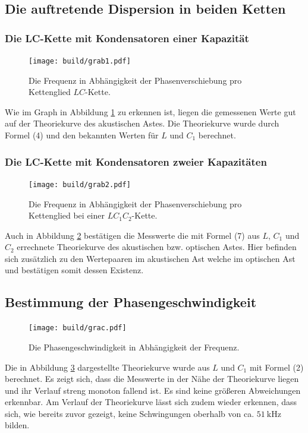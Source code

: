 \subsection{Die auftretende Dispersion in beiden Ketten}
\subsubsection{Die LC-Kette mit Kondensatoren einer Kapazität}
\begin{figure}[H]
	\centering
	\caption{Die Frequenz in Abhängigkeit der Phasenverschiebung pro Kettenglied $LC$-Kette.}
	\texttt{[image: build/grab1.pdf]}
	\label{fig:grab1}
\end{figure}

Wie im Graph in Abbildung \ref{fig:grab1} zu erkennen ist, liegen die gemessenen Werte gut auf der Theoriekurve des akustischen Astes. Die Theoriekurve wurde durch Formel (4) und den bekannten Werten für $L$ und $C_1$ berechnet.


\subsubsection{Die LC-Kette mit Kondensatoren zweier Kapazitäten}
\begin{figure}[H]
	\centering
	\caption{Die Frequenz in Abhängigkeit der Phasenverschiebung pro Kettenglied bei einer $LC_1C_2$-Kette.}
	\texttt{[image: build/grab2.pdf]}
	\label{fig:grab2}
\end{figure}

Auch in Abbildung \ref{fig:grab2} bestätigen die Messwerte die mit Formel (7) aus $L$, $C_1$ und $C_2$ errechnete Theoriekurve des akustischen bzw. optischen Astes. Hier befinden sich zusätzlich zu den Wertepaaren im akustischen Ast welche im optischen Ast und bestätigen somit dessen Existenz. 

\subsection{Bestimmung der Phasengeschwindigkeit}

\begin{figure}[H]
	\centering
	\caption{Die Phasengeschwindigkeit in Abhängigkeit der Frequenz.}
	\texttt{[image: build/grac.pdf]}
	\label{fig:grac}
\end{figure}

Die in Abbildung \ref{fig:grac} dargestellte Theoriekurve wurde aus $L$ und $C_1$ mit Formel (2) berechnet. 
Es zeigt sich, dass die Messwerte in der Nähe der Theoriekurve liegen und ihr Verlauf
 streng monoton fallend ist. Es sind keine größeren Abweichungen erkennbar. Am
  Verlauf der Theoriekurve lässt sich zudem wieder erkennen, dass sich, wie bereits zuvor
 gezeigt, keine Schwingungen oberhalb von ca. $\SI{51}{\kilo\hertz}$ bilden.

